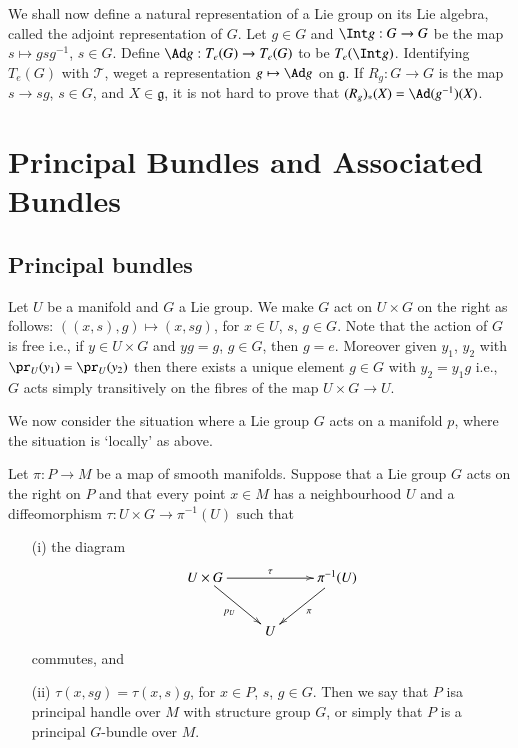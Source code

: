 We shall now define a natural representation of a Lie group on its Lie algebra, called the adjoint representation of $G$. Let $g\in G$ and $\Int g : G\to G$ be the map $s\mapsto gsg^{-1}$, $s\in G$. Define $\Ad g:T_{e}(G)\to T_{e}(G)$ to be $T_{e}(\Int g)$. Identifying $T_{e}(G)$ with $\mathscr{T}$, we\pageoriginale get a representation $g\mapsto \Ad g$ on $\mathfrak{g}$. If $R_{g}:G\to G$ is the map $s\to sg$, $s\in G$, and $X\in \mathfrak{g}$, it is not hard to prove that $(R_{g})_{*}(X)=\Ad (g^{-1})(X)$.

\section{Principal Bundles and Associated Bundles}\label{sec10}

\subsection*{Principal bundles}

\label{page43}

Let $U$ be a manifold and $G$ a Lie group. We make $G$ act on $U\times G$ on the right as follows: $((x,s),g)\mapsto (x,sg)$, for $x\in U$, $s$, $g\in G$. Note that the action of $G$ is free i.e., if $y\in U\times G$ and $yg=g$, $g\in G$, then $g=e$. Moreover given $y_{1}$, $y_{2}$ with $\pr_{U}(y_{1})=\pr_{U}(y_{2})$ then there exists a unique element $g\in G$ with $y_{2}=y_{1}g$ i.e., $G$ acts simply transitively on the fibres of the map $U\times G\to U$.

We now consider the situation where a Lie group $G$ acts on a manifold $p$, where the situation is `locally' as above.

\begin{defi*}
Let $\pi:P\to M$ be a map of smooth manifolds. Suppose that a Lie group $G$ acts on the right on $P$ and that every point $x\in M$ has a neighbourhood $U$ and a diffeomorphism $\tau : U\times G\to \pi^{-1}(U)$ such that
\begin{itemize}
\item[(i)] the diagram
\[
\xymatrix{
U\times G\ar[dr]_{p_{U}}\ar[rr]^-{\tau} & & \pi^{-1}(U)\ar[dl]^{\pi}\\
 & U & 
}
\]
commutes, and

\item[(ii)] $\tau(x,sg)=\tau(x,s)g$, for $x\in P$, $s$, $g\in G$. Then we say that $P$ is\pageoriginale a principal handle over $M$ with structure group $G$, or simply that $P$ is a principal $G$-bundle over $M$.
\end{itemize}
\end{defi*}

